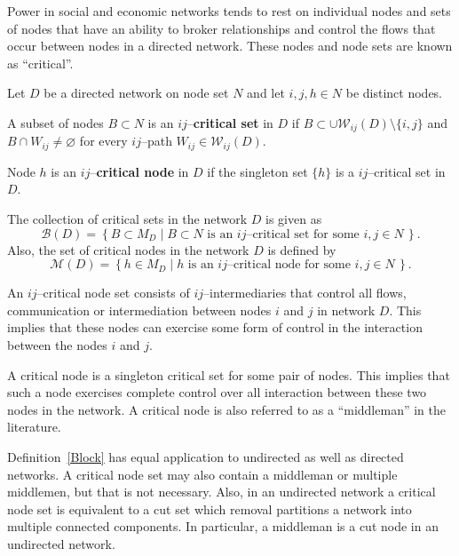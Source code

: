 Power in social and economic networks tends to rest on individual nodes and sets of nodes that have an ability to broker relationships and control the flows that occur between nodes in a directed network. These nodes and node sets are known as ``critical''.
\begin{definition} \label{Block}
Let $D$ be a directed network on node set $N$ and let $i,j,h \in N$ be distinct nodes.
\begin{abet}

\item A subset of nodes $B \subset N$ is an $ij$--\textbf{critical set} in $D$ if $B \subset \cup \mathcal{W}_{ij}(D) \setminus \{i,j\}$ and $B \cap W_{ij} \neq \varnothing$ for every $ij$--path $W_{ij} \in \mathcal{W}_{ij}(D)$.

\item Node $h$ is an $ij$--\textbf{critical node} in $D$ if the singleton set $\{ h \}$ is a $ij$--critical set in $D$.

\item The collection of critical sets in the network $D$ is given as
\begin{equation}
\mathcal{B}(D) = \left\{ B \subset M_D \mid B \subset N \mbox{ is an $ij$--critical set for some } i,j \in N \, \right\} .
\end{equation}
Also, the set of critical nodes in the network $D$ is defined by
\begin{equation}
\mathcal{M}(D) = \left\{ h \in M_D \mid h \mbox{ is an $ij$--critical node for some } i,j \in N \, \right\} .
\end{equation}

\end{abet}
\end{definition}
An $ij$--critical node set consists of $ij$--intermediaries that control all flows, communication or intermediation between nodes $i$ and $j$ in network $D$. This implies that these nodes can exercise some form of control in the interaction between the nodes $i$ and $j$.

A critical node is a singleton critical set for some pair of nodes. This implies that such a node exercises complete control over all interaction between these two nodes in the network. A critical node is also referred to as a ``middleman'' in the literature.

Definition~\ref{Block} has equal application to undirected as well as directed networks. A critical node set may also contain a middleman or multiple middlemen, but that is not necessary. Also, in an undirected network a critical node set is equivalent to a cut set which removal partitions a network into multiple connected components. In particular, a middleman is a cut node in an undirected network.

